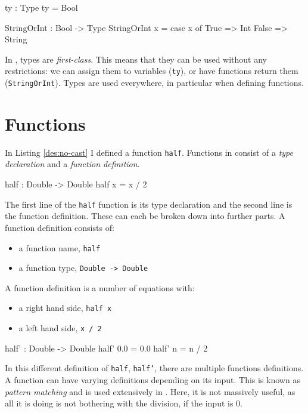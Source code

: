     \begin{code}[caption={Types are \textit{first-class}}]
        ty : Type
        ty = Bool
        
        StringOrInt : Bool -> Type
        StringOrInt x = case x of
                            True => Int
                            False => String
    \end{code}
    
    In \Idris, types are \textit{first-class}. This means that they can be used without any restrictions: we can assign them to variables (\texttt{ty}), or have functions return them (\texttt{StringOrInt}). Types are used everywhere, in particular when defining functions.
    
\newpage
    

\section{Functions}
    In Listing \ref{des:no-cast} I defined a function \texttt{half}. Functions in \Idris consist of a \textit{type declaration} and a \textit{function definition}.
    \begin{code}[caption={The \texttt{half} function from Listing \ref{des:no-cast}}]
        half : Double -> Double
        half x = x / 2
    \end{code}
    The first line of the \texttt{half} function is its type declaration and the second line is the function definition. These can each be broken down into further parts. A function definition consists of:
    \begin{itemize}
        \item a function name, \texttt{half}
        \item a function type, \texttt{Double -> Double}
    \end{itemize}
    A function definition is a number of equations with:
    \begin{itemize}
        \item a right hand side, \texttt{half x}
        \item a left hand side, \texttt{x / 2}
    \end{itemize}
    \begin{code}[caption={A different definition of \texttt{half}}]
        half' : Double -> Double
        half' 0.0 = 0.0
        half' n = n / 2
    \end{code}
    In this different definition of \texttt{half}, \texttt{half'}, there are multiple functions definitions. A function can have varying definitions depending on its input. This is known as \textit{pattern matching} and is used extensively in \Idris. Here, it is not massively useful, as all it is doing is not bothering with the division, if the input is 0.

